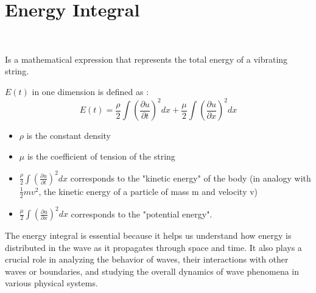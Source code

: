 \documentclass[]{article}
\begin{document}
\newpage

\section{Energy Integral}
\
\begin{definition} 
    Is a mathematical expression that represents the total energy of a vibrating string.
\end{definition}
$E(t)$ in one dimension is defined as :
\[
E(t)  =  \frac{\rho}{2} \int {\left(\frac{\partial u}{\partial t}\right)}^2 dx + \frac{\mu}{2} \int {\left(\frac{\partial u}{\partial x}\right)}^2 dx
\] 
\begin{itemize}
    \item $\rho$ is the constant density
    \item $\mu$ is the coefficient of tension of the string
    \item $\displaystyle \frac{\rho}{2} \int {\left(\frac{\partial u}{\partial t}\right)}^2 dx $ corresponds to the "kinetic energy" of the body (in analogy with $\frac{1}{2}mv^2$, the kinetic energy of a particle of mass m and velocity v)
    \item $\displaystyle \frac{\mu}{2} \int {\left(\frac{\partial u}{\partial x}\right)}^2 dx $ corresponds to the "potential energy".
\end{itemize}

The energy integral is essential because it helps us understand how energy is distributed in the wave as it propagates through space and time. It also plays a crucial role in analyzing the behavior of waves, their interactions with other waves or boundaries, and studying the overall dynamics of wave phenomena in various physical systems.
\end{document}
